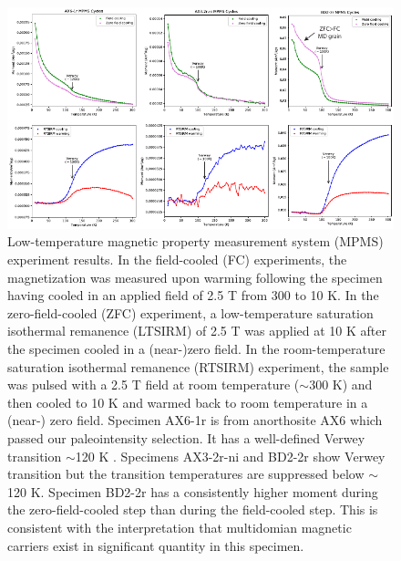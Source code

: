 \documentclass[9pt,twoside,lineno]{pnas-new}
\begin{document}
\begin{figure}
\noindent\includegraphics[width=\textwidth]{MPMS.pdf}
\centering
\caption{{Low-temperature magnetic property measurement system (MPMS) experiment results. In the field-cooled (FC) experiments, the magnetization was measured upon warming following the specimen having cooled in an applied field of 2.5 T from 300 to 10 K. In the zero-field-cooled (ZFC) experiment, a low-temperature saturation isothermal remanence (LTSIRM) of 2.5 T was applied at 10 K after the specimen cooled in a (near-)zero field. In the room-temperature saturation isothermal remanence (RTSIRM) experiment, the sample was pulsed with a 2.5 T field at room temperature ($\sim$300 K) and then cooled to 10 K and warmed back to room temperature in a (near-) zero field. Specimen AX6-1r is from anorthosite AX6 which passed our paleointensity selection. It has a well-defined Verwey transition $\sim$120 K \cite{Verwey1939a}. Specimens AX3-2r-ni and BD2-2r show Verwey transition but the transition temperatures are suppressed below $\sim$120 K. Specimen BD2-2r has a consistently higher moment during the zero-field-cooled step than during the field-cooled step. This is consistent with the interpretation that multidomian magnetic carriers exist in significant quantity in this specimen.}}
\label{fig:MPMS}
\end{figure}

\clearpage
\end{document}
